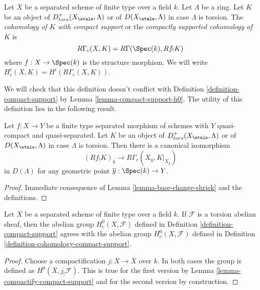 \begin{definition}
\label{definition-cohomology-compact-support}
Let $X$ be a separated scheme of finite type over a field $k$.
Let $\Lambda$ be a ring. Let $K$ be an object of
$D^+_{tors}(X_\etale, \Lambda)$
or of $D(X_\etale, \Lambda)$ in case $\Lambda$ is torsion.
The {\it cohomology of $K$ with compact support} or the
{\it compactly supported cohomology of $K$} is
$$
R\Gamma_c(X, K) = R\Gamma(\Spec(k), Rf_!K)
$$
where $f : X \to \Spec(k)$ is the structure morphism. We will
write  $H^i_c(X, K) = H^i(R\Gamma_c(X, K))$.
\end{definition}

\noindent
We will check that this definition doesn't conflict with
Definition \ref{definition-compact-support} by
Lemma \ref{lemma-compact-support-h0}.
The utility of this definition lies in the following result.

\begin{lemma}
\label{lemma-stalk-R-f-shriek}
Let $f : X \to Y$ be a finite type separated morphism of schemes
with $Y$ quasi-compact and quasi-separated. Let $K$ be an object of
$D^+_{tors}(X_\etale, \Lambda)$ or of $D(X_\etale, \Lambda)$ in case
$\Lambda$ is torsion. Then there is a canonical isomorphism
$$
(Rf_!K)_{\overline{y}}
\longrightarrow
R\Gamma_c(X_{\overline{y}}, K|_{X_{\overline{y}}})
$$
in $D(\Lambda)$ for any geometric point $\overline{y} : \Spec(k) \to Y$.
\end{lemma}

\begin{proof}
Immediate consequence of Lemma \ref{lemma-base-change-shriek} and the
definitions.
\end{proof}

\begin{lemma}
\label{lemma-compact-support-h0}
Let $X$ be a separated scheme of finite type over a field $k$.
If $\mathcal{F}$ is a torsion abelian sheaf, then the abelian group
$H^0_c(X, \mathcal{F})$ defined in Definition \ref{definition-compact-support}
agrees with the abelian group $H^0_c(X, \mathcal{F})$ defined in
Definition \ref{definition-cohomology-compact-support}.
\end{lemma}

\begin{proof}
Choose a compactification $j : X \to \overline{X}$ over $k$.
In both cases the group is defined as $H^0(\overline{X}, j_!\mathcal{F})$.
This is true for the first version by
Lemma \ref{lemma-compactify-compact-support}
and for the second version by construction.
\end{proof}

